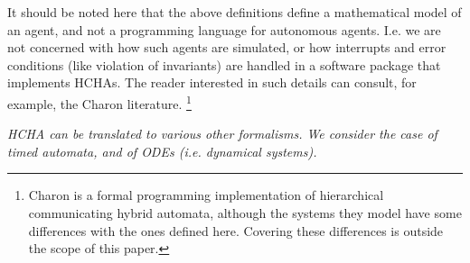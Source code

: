 









It should be noted here that the above definitions define a mathematical model of an agent, and not a programming language for autonomous agents. 
I.e. we are not concerned with how such agents are simulated, or how interrupts and error conditions (like violation of invariants) are handled in a software package that implements HCHAs.
The reader interested in such details can consult, for example, the Charon literature.
\footnote{Charon is a formal programming implementation of hierarchical communicating hybrid automata, although the systems they model have some differences with the ones defined here. Covering these differences is outside the scope of this paper.}

{\it HCHA can be translated to various other formalisms. We consider the case of timed automata, and of ODEs (i.e. dynamical systems).}

